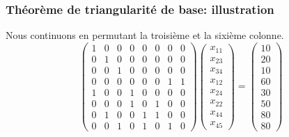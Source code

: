 \documentclass[usepdftitle=false]{beamer}
\begin{document}
\begin{frame}
\frametitle{Théorème de triangularité de base: illustration}

Nous continuons en permutant la troisième et la sixième colonne.
\[
\begin{pmatrix}
 1 & 0 & 0 & 0 & 0 & 0 & 0 & 0 \\
 0 & 1 & 0 & 0 & 0 & 0 & 0 & 0 \\
 0 & 0 & 1 & 0 & 0 & 0 & 0 & 0 \\
 0 & 0 & 0 & 0 & 0 & 0 & 1 & 1 \\
 1 & 0 & 0 & 1 & 0 & 0 & 0 & 0 \\
 0 & 0 & 0 & 1 & 0 & 1 & 0 & 0 \\
 0 & 1 & 0 & 0 & 1 & 1 & 0 & 0 \\
 0 & 0 & 1 & 0 & 1 & 0 & 1 & 0
\end{pmatrix}
\begin{pmatrix}
x_{11} \\
x_{23} \\
x_{34} \\
x_{12} \\
x_{24} \\
x_{22} \\
x_{44} \\
x_{45}
\end{pmatrix}
=
\begin{pmatrix}
10 \\
20 \\
10 \\
60 \\
30 \\
50 \\
80 \\
80
\end{pmatrix}
\]

\end{frame}
\end{document}

